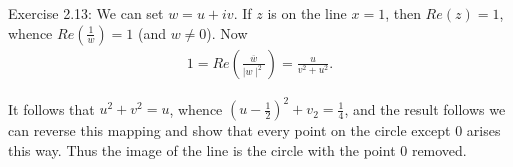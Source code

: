 

Exercise 2.13:
We can set \( w = u + iv. \) If \( z \) is on the line \( x=1 \), then \( Re(z ) = 1\),
whence \( Re(\frac{1}{w}) = 1 \) (and \( w \neq 0 \)). Now
\begin{align*}
  1 = Re(\frac{\overline{w}}{\mid w\mid^2}  )=\frac{u}{v^2 + u^2}
.\end{align*}

It follows that \(u^2 + v^2 = u \), whence \( (u-\frac{1}{2})^2 + v_{2} = \frac{1}{4} \), and the result follows
we can reverse this mapping and show that every point on the circle except 0 arises this way. Thus the image of the line is the
circle with the point 0 removed.




